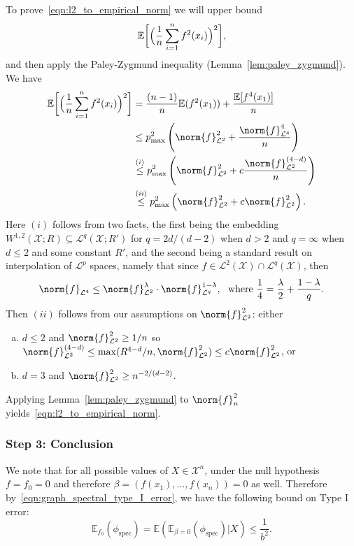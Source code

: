 \documentclass{article}
\newcommand{\1}{\mathbf{1}}
\newcommand{\Xset}{\mathcal{X}}
\newcommand{\Leb}{\mathcal{L}}
\newcommand{\Ebb}{\mathbb{E}}
\newcommand{\spec}{\mathrm{spec}}
\theoremstyle{alden}
\theoremstyle{aldenthm}
\theoremstyle{definition}
\theoremstyle{remark}
\begin{document}
To prove~\eqref{eqn:l2_to_empirical_norm} we will upper bound
\begin{equation*}
\mathbb{E}\biggl[\Bigl(\frac{1}{n}\sum_{i = 1}^{n}f^2(x_i)\Bigr)^2\biggr],
\end{equation*}
and then apply the Paley-Zygmund inequality (Lemma~\ref{lem:paley_zygmund}). We have
\begin{align*}
\mathbb{E}\biggl[\Bigl(\frac{1}{n}\sum_{i = 1}^{n}f^2(x_i)\Bigr)^2\biggr] & = \frac{(n-1)}{n}\mathbb{E}(f^2(x_1)) + \frac{\mathbb{E}[f^4(x_1)]}{n} \\
& \leq p_{\max}^2 \left(\norm{f}_{\Leb^2}^2 + \frac{\norm{f}_{\Leb^4}^4}{n}\right) \\
& \overset{(i)}{\leq} p_{\max}^2 \left(\norm{f}_{\Leb^2}^2 + c\frac{\norm{f}_{\Leb^2}^{(4 - d)}}{n}\right) \\
& \overset{(ii)}{\leq}  p_{\max}^2 \left(\norm{f}_{\Leb^2}^2 + c\norm{f}_{\Leb^2}^2\right).
\end{align*}
Here $(i)$ follows from two facts, the first being the embedding $W^{1,2}(\mathcal{X};R) \subseteq \Leb^q(\mathcal{X};R')$ for $q = 2d/(d - 2)$ when $d > 2$ and $q = \infty$ when $d \leq 2$ and some constant $R'$, and the second being a standard result on interpolation of $\Leb^p$ spaces, namely that since $f \in \Leb^2(\mathcal{X}) \cap \Leb^q(\mathcal{X})$, then 
\begin{equation*}
\norm{f}_{\Leb^4} \leq \norm{f}_{\Leb^2}^{\lambda} \cdot \norm{f}_{\Leb^q}^{1 - \lambda},~~\textrm{where}~ \frac{1}{4} = \frac{\lambda}{2} + \frac{1 - \lambda}{q}.
\end{equation*} 
Then $(ii)$ follows from our assumptions on $\norm{f}_{\Leb^2}^2$: either 
\begin{enumerate}[(a)]
	\item $d \leq 2$ and $\norm{f}_{\Leb^2}^2 \geq 1/n$ so $\norm{f}_{\Leb^2}^{(4 - d)} \leq \max(R^{4 - d}/n, \norm{f}_{\Leb^2}^2) \leq c\norm{f}_{\Leb^2}^2$, or
	\item $d = 3$ and $\norm{f}_{\Leb^2}^2 \geq n^{-2/(d - 2)}$.
\end{enumerate} 
Applying Lemma~\ref{lem:paley_zygmund} to  $\norm{f}_n^2$ yields~\eqref{eqn:l2_to_empirical_norm}.

\subsubsection{Step 3: Conclusion}

We note that for all possible values of $X \in \Xset^n$, under the null hypothesis $f = f_0 = 0$ and therefore $\beta = (f(x_1),\ldots,f(x_n)) = 0$ as well. Therefore by~\eqref{eqn:graph_spectral_type_I_error}, we have the following bound on Type I error:
\begin{equation}
\Ebb_{f_0}(\phi_{\mathrm{spec}}) = \mathbb{E}(\mathbb{E}_{\beta = 0}(\phi_{\spec}) | X) \leq \frac{1}{b^2}.
\end{equation}
\end{document}
